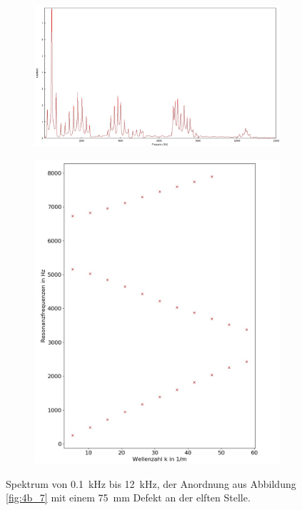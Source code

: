 \begin{figure}
\centering
\begin{subfigure}{0.65\textwidth}
\includegraphics[width=\textwidth]{content/messungen/Chapter4b/4b_7_1b.jpg}
\end{subfigure}
\begin{subfigure}{0.34\textwidth}
\includegraphics[width=\textwidth]{content/Scripts/4b_7_1b.jpg}
\end{subfigure}
\caption{Spektrum von 0.1~kHz bis 12~kHz, der Anordnung aus Abbildung \ref{fig:4b_7} mit einem 75~mm Defekt an der elften Stelle.}
\label{fig:4b_7_1b}
\end{figure}
